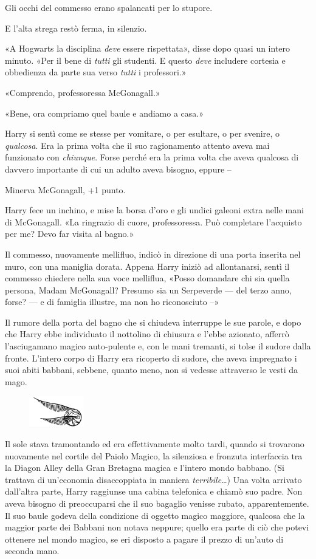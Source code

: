 Gli occhi del commesso erano spalancati per lo stupore.

E l’alta strega restò ferma, in silenzio.

«A Hogwarts la disciplina \textit{deve} essere rispettata», disse dopo quasi un intero minuto. «Per il bene di \textit{tutti} gli studenti. E questo \textit{deve} includere cortesia e obbedienza da parte sua verso \textit{tutti} i professori.»

«Comprendo, professoressa McGonagall.»

«Bene, ora compriamo quel baule e andiamo a casa.»

Harry si sentì come se stesse per vomitare, o per esultare, o per svenire, o \textit{qualcosa}. Era la prima volta che il suo ragionamento attento aveva mai funzionato con \textit{chiunque}. Forse perché era la prima volta che aveva qualcosa di davvero importante di cui un adulto aveva bisogno, eppure –

Minerva McGonagall, +1 punto.

Harry fece un inchino, e mise la borsa d’oro e gli undici galeoni extra nelle mani di McGonagall. «La ringrazio di cuore, professoressa. Può completare l’acquisto per me? Devo far visita al bagno.»

Il commesso, nuovamente mellifluo, indicò in direzione di una porta inserita nel muro, con una maniglia dorata. Appena Harry iniziò ad allontanarsi, sentì il commesso chiedere nella sua voce melliflua, «Posso domandare chi sia quella persona, Madam McGonagall? Presumo sia un Serpeverde — del terzo anno, forse? — e di famiglia illustre, ma non ho riconosciuto –»

Il rumore della porta del bagno che si chiudeva interruppe le sue parole, e dopo che Harry ebbe individuato il nottolino di chiusura e l’ebbe azionato, afferrò l’asciugamano magico auto-pulente e, con le mani tremanti, si tolse il sudore dalla fronte. L’intero corpo di Harry era ricoperto di sudore, che aveva impregnato i suoi abiti babbani, sebbene, quanto meno, non si vedesse attraverso le vesti da mago.

\begin{figure}[h]
	\includegraphics[scale=0.4]{boccino.png}
	\centering
\end{figure}

Il sole stava tramontando ed era effettivamente molto tardi, quando si trovarono nuovamente nel cortile del Paiolo Magico, la silenziosa e fronzuta interfaccia tra la Diagon Alley della Gran Bretagna magica e l’intero mondo babbano. (Si trattava di un’economia disaccoppiata in maniera \textit{terribile}…) Una volta arrivato dall’altra parte, Harry raggiunse una cabina telefonica e chiamò suo padre. Non aveva bisogno di preoccuparsi che il suo bagaglio venisse rubato, apparentemente. Il suo baule godeva della condizione di oggetto magico maggiore, qualcosa che la maggior parte dei Babbani non notava neppure; quello era parte di ciò che potevi ottenere nel mondo magico, se eri disposto a pagare il prezzo di un’auto di seconda mano.

